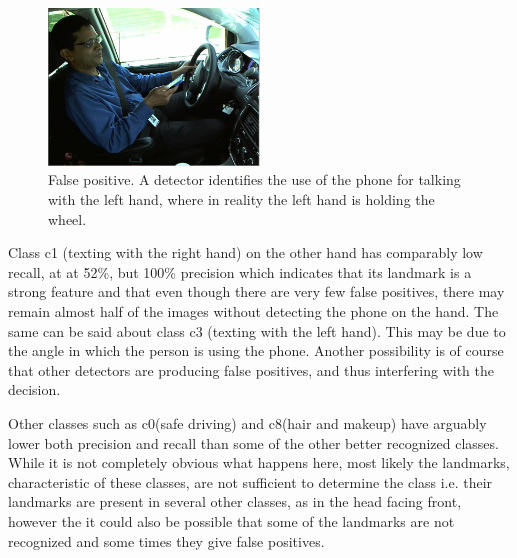 \documentclass[10pt,twocolumn,letterpaper]{article}
\begin{document}
\begin{figure}[h]
	\centering
	\includegraphics[width=0.5\textwidth]{mult_HOG/talk_phone_left}
	\caption{False positive. A detector identifies the use of the phone for talking with the left hand, where in reality the left hand is holding the wheel. }
	\label{Landmarks_false_detection}
\end{figure}

Class c1 (texting with the right hand) on the other hand has comparably low recall, at at 52\%, but 100\% precision which indicates that its landmark is a strong feature and that even though there are very few false positives, there may remain almost half of the images without detecting the phone on the hand. The same can be said about class c3 (texting with the left hand). This may be due to the angle in which the person is using the phone. Another possibility is of course that other detectors are producing false positives, and thus interfering with the decision.

Other classes such as c0(safe driving) and c8(hair and makeup) have arguably lower both precision and recall than some of the other better recognized classes. While it is not completely obvious what happens here, most likely the landmarks, characteristic of these classes, are not sufficient to determine the class i.e. their landmarks are present in several other classes, as in the head facing front, however the it could also be possible that some of the landmarks are not recognized and some times they give false positives.
\end{document}

